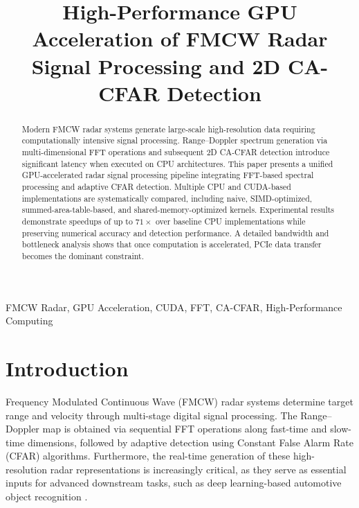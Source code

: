 \documentclass[conference, a4paper]{IEEEtran}
\begin{document}
\title{High-Performance GPU Acceleration of FMCW Radar Signal Processing and 2D CA-CFAR Detection}

\author{
\and
{}
\and
{}
}

\maketitle

\begin{abstract}
Modern FMCW radar systems generate large-scale high-resolution data requiring computationally intensive signal processing. 
Range–Doppler spectrum generation via multi-dimensional FFT operations and subsequent 2D CA-CFAR detection introduce significant latency when executed on CPU architectures. 
This paper presents a unified GPU-accelerated radar signal processing pipeline integrating FFT-based spectral processing and adaptive CFAR detection. 
Multiple CPU and CUDA-based implementations are systematically compared, including naive, SIMD-optimized, summed-area-table-based, and shared-memory-optimized kernels. 
Experimental results demonstrate speedups of up to $71\times$ over baseline CPU implementations while preserving numerical accuracy and detection performance. 
A detailed bandwidth and bottleneck analysis shows that once computation is accelerated, PCIe data transfer becomes the dominant constraint.
\end{abstract}

\begin{IEEEkeywords}
FMCW Radar, GPU Acceleration, CUDA, FFT, CA-CFAR, High-Performance Computing
\end{IEEEkeywords}

\section{Introduction}
Frequency Modulated Continuous Wave (FMCW) radar systems determine target range and velocity through multi-stage digital signal processing. The Range–Doppler map is obtained via sequential FFT operations along fast-time and slow-time dimensions, followed by adaptive detection using Constant False Alarm Rate (CFAR) algorithms. Furthermore, the real-time generation of these high-resolution radar representations is increasingly critical, as they serve as essential inputs for advanced downstream tasks, such as deep learning-based automotive object recognition \cite{9249018}.
\end{document}
